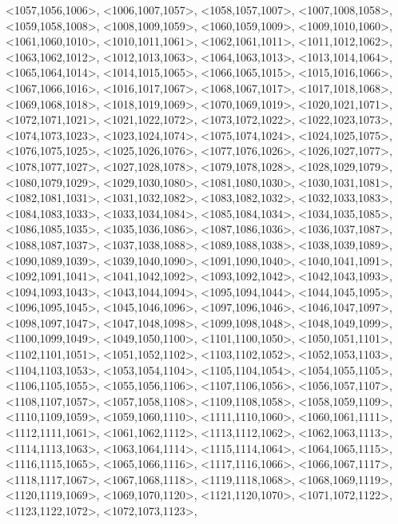 \documentclass[a4paper,10pt]{article}
\begin{document}
\begin{eulernotebook}
\begin{euleroutput}
  <1057,1056,1006>,
  <1006,1007,1057>,
  <1058,1057,1007>,
  <1007,1008,1058>,
  <1059,1058,1008>,
  <1008,1009,1059>,
  <1060,1059,1009>,
  <1009,1010,1060>,
  <1061,1060,1010>,
  <1010,1011,1061>,
  <1062,1061,1011>,
  <1011,1012,1062>,
  <1063,1062,1012>,
  <1012,1013,1063>,
  <1064,1063,1013>,
  <1013,1014,1064>,
  <1065,1064,1014>,
  <1014,1015,1065>,
  <1066,1065,1015>,
  <1015,1016,1066>,
  <1067,1066,1016>,
  <1016,1017,1067>,
  <1068,1067,1017>,
  <1017,1018,1068>,
  <1069,1068,1018>,
  <1018,1019,1069>,
  <1070,1069,1019>,
  <1020,1021,1071>,
  <1072,1071,1021>,
  <1021,1022,1072>,
  <1073,1072,1022>,
  <1022,1023,1073>,
  <1074,1073,1023>,
  <1023,1024,1074>,
  <1075,1074,1024>,
  <1024,1025,1075>,
  <1076,1075,1025>,
  <1025,1026,1076>,
  <1077,1076,1026>,
  <1026,1027,1077>,
  <1078,1077,1027>,
  <1027,1028,1078>,
  <1079,1078,1028>,
  <1028,1029,1079>,
  <1080,1079,1029>,
  <1029,1030,1080>,
  <1081,1080,1030>,
  <1030,1031,1081>,
  <1082,1081,1031>,
  <1031,1032,1082>,
  <1083,1082,1032>,
  <1032,1033,1083>,
  <1084,1083,1033>,
  <1033,1034,1084>,
  <1085,1084,1034>,
  <1034,1035,1085>,
  <1086,1085,1035>,
  <1035,1036,1086>,
  <1087,1086,1036>,
  <1036,1037,1087>,
  <1088,1087,1037>,
  <1037,1038,1088>,
  <1089,1088,1038>,
  <1038,1039,1089>,
  <1090,1089,1039>,
  <1039,1040,1090>,
  <1091,1090,1040>,
  <1040,1041,1091>,
  <1092,1091,1041>,
  <1041,1042,1092>,
  <1093,1092,1042>,
  <1042,1043,1093>,
  <1094,1093,1043>,
  <1043,1044,1094>,
  <1095,1094,1044>,
  <1044,1045,1095>,
  <1096,1095,1045>,
  <1045,1046,1096>,
  <1097,1096,1046>,
  <1046,1047,1097>,
  <1098,1097,1047>,
  <1047,1048,1098>,
  <1099,1098,1048>,
  <1048,1049,1099>,
  <1100,1099,1049>,
  <1049,1050,1100>,
  <1101,1100,1050>,
  <1050,1051,1101>,
  <1102,1101,1051>,
  <1051,1052,1102>,
  <1103,1102,1052>,
  <1052,1053,1103>,
  <1104,1103,1053>,
  <1053,1054,1104>,
  <1105,1104,1054>,
  <1054,1055,1105>,
  <1106,1105,1055>,
  <1055,1056,1106>,
  <1107,1106,1056>,
  <1056,1057,1107>,
  <1108,1107,1057>,
  <1057,1058,1108>,
  <1109,1108,1058>,
  <1058,1059,1109>,
  <1110,1109,1059>,
  <1059,1060,1110>,
  <1111,1110,1060>,
  <1060,1061,1111>,
  <1112,1111,1061>,
  <1061,1062,1112>,
  <1113,1112,1062>,
  <1062,1063,1113>,
  <1114,1113,1063>,
  <1063,1064,1114>,
  <1115,1114,1064>,
  <1064,1065,1115>,
  <1116,1115,1065>,
  <1065,1066,1116>,
  <1117,1116,1066>,
  <1066,1067,1117>,
  <1118,1117,1067>,
  <1067,1068,1118>,
  <1119,1118,1068>,
  <1068,1069,1119>,
  <1120,1119,1069>,
  <1069,1070,1120>,
  <1121,1120,1070>,
  <1071,1072,1122>,
  <1123,1122,1072>,
  <1072,1073,1123>,

\end{euleroutput}
\end{eulernotebook}
\end{document}
